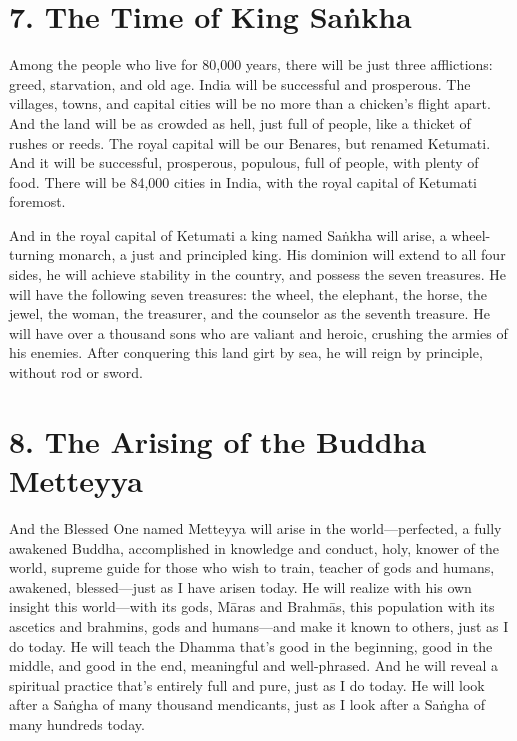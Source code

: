 \documentclass[12pt,openany]{book}%
\begin{document}
\section*{7. The Time of King \textsanskrit{Saṅkha} }

Among the people who live for 80,000 years, there will be just three afflictions: greed, starvation, and old age. India will be successful and prosperous. The villages, towns, and capital cities will be no more than a chicken’s flight apart. And the land will be as crowded as hell, just full of people, like a thicket of rushes or reeds. The royal capital will be our Benares, but renamed Ketumati. And it will be successful, prosperous, populous, full of people, with plenty of food. There will be 84,000 cities in India, with the royal capital of Ketumati foremost. 

And in the royal capital of Ketumati a king named \textsanskrit{Saṅkha} will arise, a wheel-turning monarch, a just and principled king. His dominion will extend to all four sides, he will achieve stability in the country, and possess the seven treasures. He will have the following seven treasures: the wheel, the elephant, the horse, the jewel, the woman, the treasurer, and the counselor as the seventh treasure. He will have over a thousand sons who are valiant and heroic, crushing the armies of his enemies. After conquering this land girt by sea, he will reign by principle, without rod or sword. 

\section*{8. The Arising of the Buddha Metteyya }

And the Blessed One named Metteyya will arise in the world—perfected, a fully awakened Buddha, accomplished in knowledge and conduct, holy, knower of the world, supreme guide for those who wish to train, teacher of gods and humans, awakened, blessed—just as I have arisen today. He will realize with his own insight this world—with its gods, \textsanskrit{Māras} and \textsanskrit{Brahmās}, this population with its ascetics and brahmins, gods and humans—and make it known to others, just as I do today. He will teach the Dhamma that’s good in the beginning, good in the middle, and good in the end, meaningful and well-phrased. And he will reveal a spiritual practice that’s entirely full and pure, just as I do today. He will look after a \textsanskrit{Saṅgha} of many thousand mendicants, just as I look after a \textsanskrit{Saṅgha} of many hundreds today. 
\end{document}
